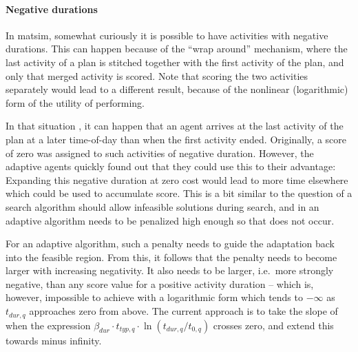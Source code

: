 \paragraph*{Negative durations}

In \acrshort{matsim}, somewhat curiously it is possible to have activities with negative durations.  This can happen because of the ``wrap around'' mechanism, where the last activity of a plan is stitched together with the first activity of the plan, and only that merged activity is scored.  Note that scoring the two activities separately would lead to a different result, because of the nonlinear (logarithmic) form of the utility of performing. 



In that situation , it can happen that an agent arrives at the last activity of the plan at a later time-of-day than when the first activity ended.  Originally, a score of zero was assigned to such activities of negative duration.  However, the adaptive agents quickly found out that they could use this to their advantage: Expanding this negative duration at zero cost would lead to more time elsewhere which could be used to accumulate score.  This is a bit similar to the question of a search algorithm should allow infeasible solutions during search, and in an adaptive algorithm needs to be penalized high enough so that does not occur.

For an adaptive algorithm, such a penalty needs to guide the adaptation back into the feasible region.  From this, it follows that the penalty needs to become larger with increasing negativity.  It also needs to be larger, i.e.\ more strongly negative, than any score value for a positive activity duration -- which is, however, impossible to achieve with a logarithmic form which tends to $-\infty$ as $t_{dur,q}$ approaches zero from above.  The current approach is to take the slope of when the expression $\beta_{dur} \cdot t_{typ,q} \cdot \ln( t_{dur,q} / t_{0,q} )$ crosses zero, and extend this towards minus infinity.






